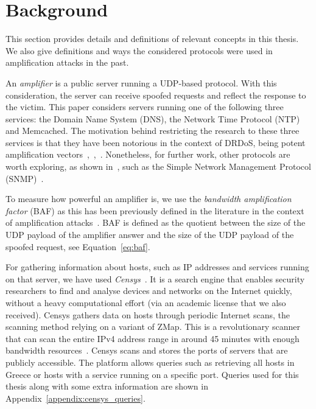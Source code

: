 \section{Background}

 This section provides details and definitions of relevant concepts in this thesis. We also give definitions and ways the considered protocols were used in amplification attacks in the past. 

 An \textit{amplifier} is a public server running a UDP-based protocol. With this consideration, the server can receive spoofed requests and reflect the response to the victim. This paper considers servers running one of the following three services: the Domain Name System (DNS), the Network Time Protocol (NTP) and Memcached. The motivation behind restricting the research to these three services is that they have been notorious in the context of DRDoS, being potent amplification vectors~\cite{cloud_dns_ampl},~\cite{cloudflare_ntp_ampl},~\cite{cloud_memcached_ampl}. Nonetheless, for further work, other protocols are worth exploring, as shown in~\cite{amplification_hell}, such as the Simple Network Management Protocol (SNMP)~\cite{imperva_snmp}. 

 To measure how powerful an amplifier is, we use the \textit{bandwidth amplification factor} (BAF) as this has been previously defined in the literature in the context of amplification attacks~\cite{amplification_hell}. BAF is defined as the quotient between the size of the UDP payload of the amplifier answer and the size of the UDP payload of the spoofed request, see Equation~\eqref{eq:baf}. 

 For gathering information about hosts, such as IP addresses and services running on that server, we have used \textit{Censys}~\cite{censys15}. It is a search engine that enables security researchers to find and analyse devices and networks on the Internet quickly, without a heavy computational effort (via an academic license that we also received). Censys gathers data on hosts through periodic Internet scans, the scanning method relying on a variant of ZMap. This is a revolutionary scanner that can scan the entire IPv4 address range in around 45 minutes with enough bandwidth resources~\cite{zmap}. Censys scans and stores the ports of servers that are publicly accessible. The platform allows queries such as retrieving all hosts in Greece or hosts with a service running on a specific port. Queries used for this thesis along with some extra information are shown in Appendix~\ref{appendix:censys_queries}.


